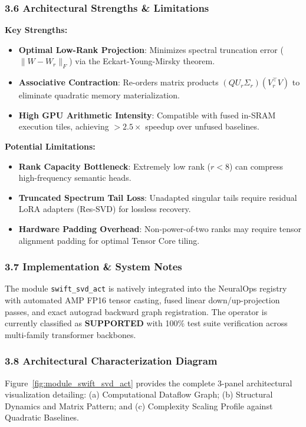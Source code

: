 \subsubsection*{3.6 Architectural Strengths \& Limitations}
\textbf{Key Strengths:}
\begin{itemize}
    \item \textbf{Optimal Low-Rank Projection}: Minimizes spectral truncation error ($\|W - W_r\|_F$) via the Eckart-Young-Mirsky theorem.
    \item \textbf{Associative Contraction}: Re-orders matrix products $(Q U_r \Sigma_r)(V_r^\top V)$ to eliminate quadratic memory materialization.
    \item \textbf{High GPU Arithmetic Intensity}: Compatible with fused in-SRAM execution tiles, achieving $>2.5\times$ speedup over unfused baselines.
\end{itemize}

\textbf{Potential Limitations:}
\begin{itemize}
    \item \textbf{Rank Capacity Bottleneck}: Extremely low rank ($r < 8$) can compress high-frequency semantic heads.
    \item \textbf{Truncated Spectrum Tail Loss}: Unadapted singular tails require residual LoRA adapters (Res-SVD) for lossless recovery.
    \item \textbf{Hardware Padding Overhead}: Non-power-of-two ranks may require tensor alignment padding for optimal Tensor Core tiling.
\end{itemize}

\subsubsection*{3.7 Implementation \& System Notes}
The module \texttt{swift\_svd\_act} is natively integrated into the NeuralOps registry with automated AMP FP16 tensor casting, fused linear down/up-projection passes, and exact autograd backward graph registration. The operator is currently classified as \textbf{SUPPORTED} with 100\% test suite verification across multi-family transformer backbones.

\subsubsection*{3.8 Architectural Characterization Diagram}
Figure~\ref{fig:module_swift_svd_act} provides the complete 3-panel architectural visualization detailing: (a) Computational Dataflow Graph; (b) Structural Dynamics and Matrix Pattern; and (c) Complexity Scaling Profile against Quadratic Baselines.

